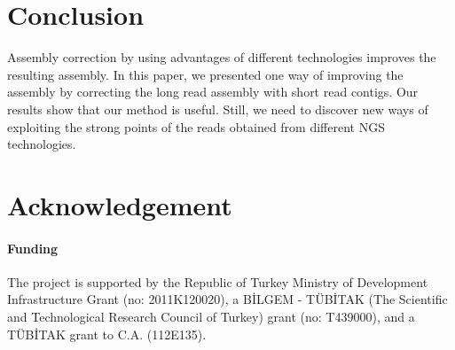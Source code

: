 \documentclass[12pt]{article}
\begin{document}
\section{Conclusion}
\label{conc}
Assembly correction by using advantages of different technologies improves the resulting assembly. In this paper, we presented one way of improving the assembly by correcting the long read assembly with short read contigs. Our results show that our method is useful. Still, we need to discover new ways of exploiting the strong points of the reads obtained from different NGS technologies.

\section*{Acknowledgement}
\paragraph{Funding\textcolon}
The project is supported by the Republic of Turkey Ministry of Development Infrastructure Grant (no: 2011K120020), a B\.{I}LGEM \-- T\"{U}B\.{I}TAK (The Scientific and Technological Research Council of Turkey) grant (no: T439000), and a T\"{U}B\.{I}TAK grant to C.A. (112E135).\\


%
%
%
%
%
%
%
%
%
\end{document}
